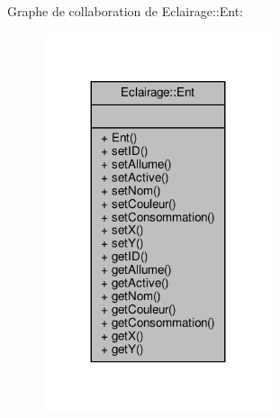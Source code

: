 Graphe de collaboration de Eclairage\+:\+:Ent\+:
\nopagebreak
\begin{figure}[H]
\begin{center}
\leavevmode
\includegraphics[width=191pt]{classEclairage_1_1Ent__coll__graph}
\end{center}
\end{figure}
